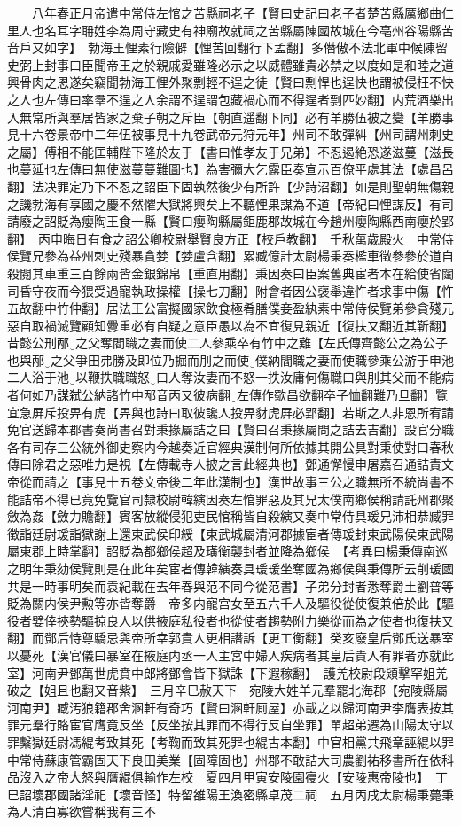 　　八年春正月帝遣中常侍左悺之苦縣祠老子【賢曰史記曰老子者楚苦縣厲鄉曲仁里人也名耳字耼姓李為周守藏史有神廟故就祠之苦縣屬陳國故城在今亳州谷陽縣苦音戶又如字】　勃海王悝素行險僻【悝苦回翻行下孟翻】多僭傲不法北軍中候陳留史弼上封事曰臣聞帝王之於親戚愛雖隆必示之以威體雖貴必禁之以度如是和睦之道興骨肉之恩遂矣竊聞勃海王悝外聚剽輕不逞之徒【賢曰剽悍也逞快也謂被侵枉不快之人也左傳曰率羣不逞之人余謂不逞謂包藏禍心而不得逞者剽匹妙翻】内荒酒樂出入無常所與羣居皆家之棄子朝之斥臣【朝直遥翻下同】必有羊勝伍被之變【羊勝事見十六卷景帝中二年伍被事見十九卷武帝元狩元年】州司不敢彈糾【州司謂州刺史之屬】傅相不能匡輔陛下隆於友于【書曰惟孝友于兄弟】不忍遏絶恐遂滋蔓【滋長也蔓延也左傳曰無使滋蔓蔓難圖也】為害彌大乞露臣奏宣示百僚平處其法【處昌呂翻】法决罪定乃下不忍之詔臣下固執然後少有所許【少詩沼翻】如是則聖朝無傷親之譏勃海有享國之慶不然懼大獄將興矣上不聽悝果謀為不道【帝紀曰悝謀反】有司請廢之詔貶為癭陶王食一縣【賢曰癭陶縣屬鉅鹿郡故城在今趙州癭陶縣西南癭於郢翻】　丙申晦日有食之詔公卿校尉舉賢良方正【校戶教翻】　千秋萬歲殿火　中常侍侯覽兄參為益州刺史殘暴貪婪【婪盧含翻】累臧億計太尉楊秉奏檻車徵參參於道自殺閱其車重三百餘兩皆金銀錦帛【重直用翻】秉因奏曰臣案舊典宦者本在給使省闥司昏守夜而今猥受過寵執政操權【操七刀翻】附會者因公襃舉違忤者求事中傷【忤五故翻中竹仲翻】居法王公富擬國家飲食極肴膳僕妾盈紈素中常侍侯覽弟參貪殘元惡自取禍滅覽顧知釁重必有自疑之意臣愚以為不宜復見親近【復扶又翻近其靳翻】昔懿公刑邴之父奪閻職之妻而使二人參乘卒有竹中之難【左氏傳齊懿公之為公子也與邴之父爭田弗勝及即位乃掘而刖之而使僕納閻職之妻而使職參乘公游于申池二人浴于池以鞭抶職職怒曰人奪汝妻而不怒一抶汝庸何傷職曰與刖其父而不能病者何如乃謀弑公納諸竹中邴音丙又彼病翻左傳作歜昌欲翻卒子恤翻難乃旦翻】覽宜急屏斥投畀有虎【畀與也詩曰取彼讒人投畀豺虎屛必郢翻】若斯之人非恩所宥請免官送歸本郡書奏尚書召對秉掾屬詰之曰【賢曰召秉掾屬問之詰去吉翻】設官分職各有司存三公統外御史察内今越奏近官經典漢制何所依據其開公具對秉使對曰春秋傳曰除君之惡唯力是視【左傳載寺人披之言此經典也】鄧通懈慢申屠嘉召通詰責文帝從而請之【事見十五卷文帝後二年此漢制也】漢世故事三公之職無所不統尚書不能詰帝不得已竟免覽官司隸校尉韓縯因奏左悺罪惡及其兄太僕南鄉侯稱請託州郡聚斂為姦【斂力贍翻】賓客放縱侵犯吏民悺稱皆自殺縯又奏中常侍具瑗兄沛相恭臧罪徵詣廷尉瑗詣獄謝上還東武侯印綬【東武城屬清河郡據宦者傳瑗封東武陽侯東武陽屬東郡上時掌翻】詔貶為都鄉侯超及璜衡襲封者並降為鄉侯　【考異曰楊秉傳南巡之明年秉劾侯覽則是在此年矣宦者傳韓縯奏具瑗瑗坐奪國為鄉侯與秉傳所云削瑗國共是一時事明矣而袁紀載在去年春與范不同今從范書】子弟分封者悉奪爵土劉普等貶為關内侯尹勲等亦皆奪爵　帝多内寵宫女至五六千人及驅役從使復兼倍於此【驅役者嬖倖挾勢驅掠良人以供掖庭私役者也從使者趨勢附力樂從而為之使者也復扶又翻】而鄧后恃尊驕忌與帝所幸郭貴人更相譖訴【更工衡翻】癸亥廢皇后鄧氏送暴室以憂死【漢官儀曰暴室在掖庭内丞一人主宮中婦人疾病者其皇后貴人有罪者亦就此室】河南尹鄧萬世虎賁中郎將鄧會皆下獄誅【下遐稼翻】　護羌校尉段熲擊罕姐羌破之【姐且也翻又音紫】　三月辛巳赦天下　宛陵大姓羊元羣罷北海郡【宛陵縣屬河南尹】臧汚狼籍郡舍溷軒有奇巧【賢曰溷軒厠屋】亦載之以歸河南尹李膺表按其罪元羣行賂宦官膺竟反坐【反坐按其罪而不得行反自坐罪】單超弟遷為山陽太守以罪繫獄廷尉馮緄考致其死【考鞠而致其死罪也緄古本翻】中官相黨共飛章誣緄以罪中常侍蘇康管霸固天下良田美業【固障固也】州郡不敢詰大司農劉祐移書所在依科品沒入之帝大怒與膺緄俱輸作左校　夏四月甲寅安陵園寑火【安陵惠帝陵也】　丁巳詔壞郡國諸淫祀【壞音怪】特留雒陽王渙密縣卓茂二祠　五月丙戌太尉楊秉薨秉為人清白寡欲嘗稱我有三不
